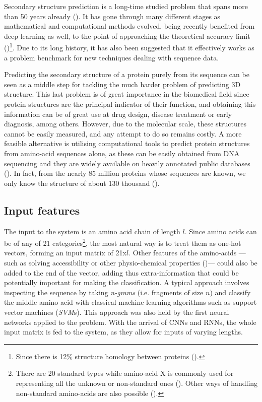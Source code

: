 
Secondary structure prediction is a long-time studied problem that spans more than 50 years already (\cite{Pauling1951}). It has gone through many different stages as mathematical and computational methods evolved, being recently benefited from deep learning as well, to the point of approaching the theoretical accuracy limit (\cite{Heffernan2017})\footnote{Since there is 12\% structure homology between proteins (\cite{Rost2001}).}. Due to its long history, it has also been suggested that it effectively works as a problem benchmark for new techniques dealing with sequence data.

Predicting the secondary structure of a protein purely from its sequence can be seen as a middle step for tackling the much harder problem of predicting 3D structure. This last problem is of great importance in the biomedical field since protein structures are the principal indicator of their function, and obtaining this information can be of great use at drug design, disease treatment or early diagnosis, among others. However, due to the molecular scale, these structures cannot be easily measured, and any attempt to do so remains costly. A more feasible alternative is utilising computational tools to predict protein structures from amino-acid sequences alone, as these can be easily obtained from DNA sequencing and they are widely available on heavily annotated public databases (\cite{Dill2012}). In fact, from the nearly 85 million proteins whose sequences are known, we only know the structure of about 130 thousand (\cite{Hattori2017}).

\subsection{Input features}
The input to the system is an amino acid chain of length $l$. Since amino acids can be of any of 21 categories\footnote{There are 20 standard types while amino-acid X is commonly used for representing all the unknown or non-standard ones (\cite{Zhou2018}). Other ways of handling non-standard amino-acids are also possible (\cite{Fang2017}).}, the most natural way is to treat them as one-hot vectors, forming an input matrix of 21x$l$. Other features of the amino-acids ---such as solving accessibility or other physio-chemical properties (\cite{Fauchere1988})--- could also be added to the end of the vector, adding thus extra-information that could be potentially important for making the classification. A typical approach involves inspecting the sequence by taking \textit{n-grams} (i.e. fragments of size $n$) and classify the middle amino-acid with classical machine learning algorithms such as support vector machines (\textit{SVM}s). This approach was also held by the first neural networks applied to the problem. With the arrival of CNNs and RNNs, the whole input matrix is fed to the system, as they allow for inputs of varying lengths.

